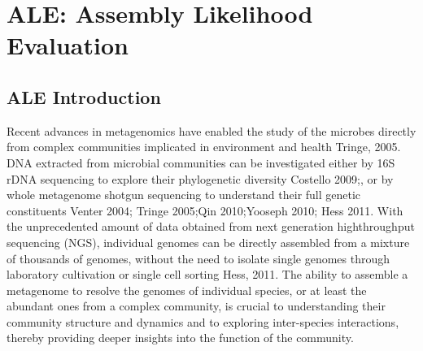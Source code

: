 \documentclass[phd,tocprelim]{cornell}
\begin{document}
\contentspage
\tablelistpage
\figurelistpage

\normalspacing \setcounter{page}{1} 
\pagestyle{cornell} \addtolength{\parskip}{0.5\baselineskip}

\part{ALE: Assembly Likelihood Evaluation} %
\label{prt:ALE: Assembly Likelihood Evaluation}

\chapter{ALE Introduction} %
\label{cha:ALE Introduction}

Recent advances in metagenomics have enabled the study of the microbes directly from complex communities implicated in environment and health {Tringe, 2005}.  DNA extracted from microbial communities can be investigated either by 16S rDNA sequencing to explore their phylogenetic diversity {Costello 2009;}, or by whole metagenome shotgun sequencing to understand their full genetic constituents {Venter 2004; Tringe 2005;Qin 2010;Yooseph 2010; Hess 2011}. With the unprecedented amount of data obtained from next generation highthroughput sequencing (NGS), individual genomes can be directly assembled from a mixture of thousands of genomes, without the need to isolate single genomes through laboratory cultivation or single cell sorting {Hess, 2011}. The ability to assemble a metagenome to resolve the genomes of individual species, or at least the abundant ones from a complex community, is crucial to understanding their community structure and dynamics and to exploring inter-species interactions, thereby providing deeper insights into the function of the community. 
\end{document}
